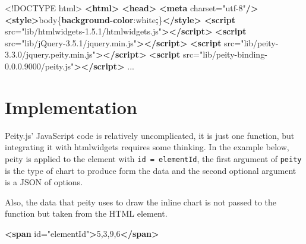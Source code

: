\documentclass[10pt,]{krantz}
\makeatletter
\newenvironment{Shaded}{\begin{snugshade}}{\end{snugshade}}
\newcommand{\AttributeTok}[1]{\textcolor[rgb]{0.61,0.61,0.61}{#1}}
\newcommand{\ConstantTok}[1]{\textcolor[rgb]{0,0,0}{#1}}
\newcommand{\DataTypeTok}[1]{\textcolor[rgb]{0.27,0.27,0.27}{#1}}
\newcommand{\KeywordTok}[1]{\textcolor[rgb]{0.27,0.27,0.27}{\textbf{#1}}}
\newcommand{\NormalTok}[1]{#1}
\newcommand{\OperatorTok}[1]{\textcolor[rgb]{0.43,0.43,0.43}{\textbf{#1}}}
\newcommand{\OtherTok}[1]{\textcolor[rgb]{0.37,0.37,0.37}{#1}}
\newcommand{\StringTok}[1]{\textcolor[rgb]{0.5,0.5,0.5}{#1}}
\newenvironment{kframe}{%
\medskip{}
\setlength{\fboxsep}{.8em}
 \def\at@end@of@kframe{}%
 \ifinner\ifhmode%
  \def\at@end@of@kframe{\end{minipage}}%
  \begin{minipage}{\columnwidth}%
 \fi\fi%
 \def\FrameCommand##1{\hskip\@totalleftmargin \hskip-\fboxsep
 \colorbox{shadecolor}{##1}\hskip-\fboxsep
     \hskip-\linewidth \hskip-\@totalleftmargin \hskip\columnwidth}%
 \MakeFramed {\advance\hsize-\width
   \@totalleftmargin\z@ \linewidth\hsize
   \@setminipage}}%
 {\par\unskip\endMakeFramed%
 \at@end@of@kframe}
\renewenvironment{Shaded}{\begin{kframe}}{\end{kframe}}
\makeatother
\begin{document}
\begin{Shaded}
\begin{Highlighting}[]
\DataTypeTok{<!DOCTYPE }\NormalTok{html}\DataTypeTok{>}
\KeywordTok{<html>}
\KeywordTok{<head>}
\KeywordTok{<meta}\OtherTok{ charset=}\StringTok{"utf-8"}\KeywordTok{/>}
\KeywordTok{<style>}\NormalTok{body\{}\KeywordTok{background-color}\NormalTok{:}\ConstantTok{white}\OperatorTok{;}\NormalTok{\}}\KeywordTok{</style>}
\KeywordTok{<script}\OtherTok{ src=}\StringTok{"lib/htmlwidgets-1.5.1/htmlwidgets.js"}\KeywordTok{></script>}
\KeywordTok{<script}\OtherTok{ src=}\StringTok{"lib/jQuery-3.5.1/jquery.min.js"}\KeywordTok{></script>}
\KeywordTok{<script}\OtherTok{ src=}\StringTok{"lib/peity-3.3.0/jquery.peity.min.js"}\KeywordTok{></script>}
\KeywordTok{<script}\OtherTok{ src=}\StringTok{"lib/peity-binding-0.0.0.9000/peity.js"}\KeywordTok{></script>}
\NormalTok{...}
\end{Highlighting}
\end{Shaded}

\hypertarget{widgets-realistic-implementation}{%
\section{Implementation}\label{widgets-realistic-implementation}}

Peity.js' JavaScript code is relatively uncomplicated, it is just one function, but integrating it with htmlwidgets requires some thinking. In the example below, peity is applied to the element with \texttt{id\ =\ \textquotesingle{}elementId\textquotesingle{}}, the first argument of \texttt{peity} is the type of chart to produce form the data and the second optional argument is a JSON of options.

\begin{Shaded}
\end{Shaded}

Also, the data that peity uses to draw the inline chart is not passed to the function but taken from the HTML element.

\begin{Shaded}
\begin{Highlighting}[]
\KeywordTok{<span}\OtherTok{ id=}\StringTok{"elementId"}\KeywordTok{>}\NormalTok{5,3,9,6}\KeywordTok{</span>}
\end{Highlighting}
\end{Shaded}
\end{document}
